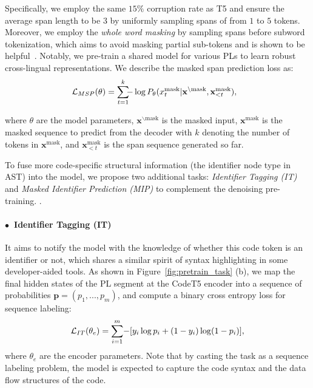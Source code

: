 \documentclass[11pt]{article}
\begin{document}
Specifically, we employ the same $15\%$ corruption rate as T5 and ensure the average span length to be $3$ by uniformly sampling spans of from $1$ to $5$ tokens. Moreover, we employ the \emph{whole word masking} by sampling spans  before subword tokenization, which aims to avoid masking partial sub-tokens and is shown to be helpful~\cite{DBLP:journals/corr/abs-1904-09223}. 
Notably, we pre-train a shared model for various PLs to learn robust  cross-lingual representations. 
We  describe  the masked span prediction loss as:
\begin{equation}\label{eq:S2S}
\vspace{-0.5em}
 \small 
\hspace{-0.8em}  \mathcal{L}_{MSP} (\theta) = \sum_{t = 1}^{k} \hspace{-0.5em} -\log P_{\theta} (x^{\text{mask}}_t| \mathbf{x}^{\backslash \text{mask}}, \mathbf{x}^{\text{mask}}_{<t}),
\normalsize  
\end{equation}

\noindent where $\theta$ are the model parameters, $\mathbf{x}^{\backslash \text{mask}}$ is the masked input, $\mathbf{x}^{\text{mask}}$ is the masked sequence to predict from the decoder with $k$ denoting the number of tokens in $\mathbf{x}^{\text{mask}}$, and $\mathbf{x}^{\text{mask}}_{<t}$ is the span sequence generated so far.
 
 To fuse more code-specific structural information (the identifier node type in AST) into the model, we propose two additional tasks: \textit{Identifier Tagging (IT)} and \textit{Masked Identifier Prediction (MIP)} to complement the denoising pre-training.
.
 
\paragraph{$\bullet$~Identifier Tagging (IT)} 
It aims to notify the model with the knowledge of whether this code token is an identifier or not, which shares a similar spirit of syntax highlighting in some developer-aided tools.
As shown in Figure~\ref{fig:pretrain_task} (b), we map the final hidden states of the PL segment at the CodeT5 encoder into a sequence of probabilities $\mathbf{p}=(p_1, ...,p_m)$, and compute a binary cross entropy loss for sequence labeling:
 \begin{equation}\label{eq:it}
 \small 
 \vspace{-0.3em}
 \mathcal{L}_{IT} (\theta_{e}) = \sum_{i=1}^m \hspace{-0.2em} -[y_i \log p_i + (1-y_i) \log (1-p_i)],
 \normalsize
 \end{equation}
\noindent where $\theta_e$ are the encoder parameters. Note that by casting the task as a sequence labeling problem, the model is expected to capture the code syntax and the data flow structures of the code.
 
\end{document}
